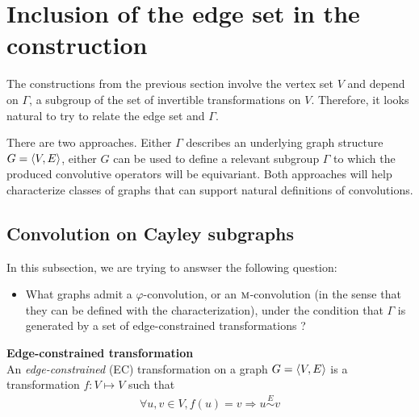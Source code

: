 \section{Inclusion of the edge set in the construction}
\label{sec:edges}


The constructions from the previous section involve the vertex set $V$ and depend on $\Gamma$, a subgroup of the set of invertible transformations on $V$. Therefore, it looks natural to try to relate the edge set and $\Gamma$.

There are two approaches. Either $\Gamma$ describes an underlying graph structure $G = \langle V, E \rangle$, either $G$ can be used to define a relevant subgroup $\Gamma$ to which the produced convolutive operators will be equivariant. Both approaches will help characterize classes of graphs that can support natural definitions of convolutions.




\subsection{Convolution on Cayley subgraphs}

In this subsection, we are trying to answser the following question:
\begin{itemize}
	\item What graphs admit a $\varphi$-convolution, or an $\operatorname{\textsc{m}}$-convolution (in the sense that they can be defined with the characterization), under the condition that $\Gamma$ is generated by a set of edge-constrained transformations ?
\end{itemize}

\begin{definition}\textbf{Edge-constrained transformation}\\
An \emph{edge-constrained} (EC) transformation on a graph $G = \langle V, E \rangle$ is a transformation $f: V \mapsto V$ such that
\begin{gather*}
\forall u,v \in V, f(u) = v \Rightarrow u \overset{E}{\sim} v
\end{gather*}
\end{definition}


